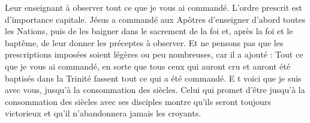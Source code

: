  Leur enseignant à observer tout ce que je vous ai commandé. L’ordre prescrit est d’importance capitale. Jésus a commandé aux Apôtres d’enseigner d’abord toutes les Nations, puis de les baigner dans le sacrement de la foi et, après la foi et le baptême, de leur donner les préceptes à observer. Et ne pensons pas que les prescriptions imposées soient légères ou peu nombreuses, car il a ajouté : Tout ce que je vous ai commandé, en sorte que tous ceux qui auront cru et auront été baptisés dans la Trinité fassent tout ce qui a été commandé. E t voici que je suis avec vous, jusqu’à la consommation des siècles. Celui qui promet d’être jusqu’à la consommation des siècles avec ses disciples montre qu’ils seront toujours victorieux et qu’il n’abandonnera jamais les croyants.